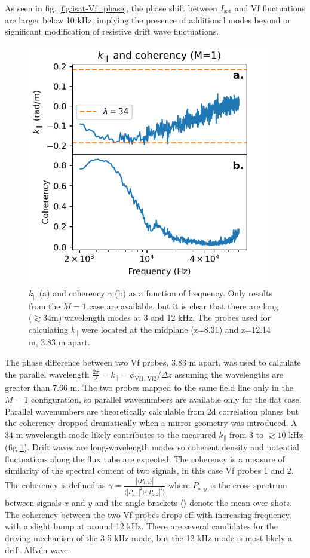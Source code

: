 As seen in fig. \ref{fig:isat-Vf_phase}, the phase shift between $I_\text{sat}$ and Vf fluctuations are larger below 10 kHz, implying the presence of additional modes beyond or significant modification of resistive drift wave fluctuations.
\begin{figure}
    \centering
    \includegraphics[width=300pt]{figures/fig11.pdf}
    \caption[$k_\parallel$ and coherency $\gamma$]{$k_\parallel$ (a) and coherency $\gamma$ (b) as a function of frequency. Only results from the $M=1$ case are available, but it is clear that there are long ($\gtrsim 34$m) wavelength modes at 3 and 12 kHz. The probes used for calculating $k_\parallel$ were located at the midplane (z=8.31) and z=12.14 m, 3.83 m apart.}
    \label{fig:kparallel-coherency}
\end{figure}
The phase difference between two Vf probes, $3.83$ m apart, was used to calculate the parallel wavelength $\frac{2 \pi}{\lambda} = k_\parallel = \phi_{\text{Vf1, Vf2}} / \Delta z$ assuming the wavelengths are greater than $7.66$ m. The two probes mapped to the same field line only in the $M=1$ configuration, so parallel wavenumbers are available only for the flat case. Parallel wavenumbers are theoretically calculable from 2d correlation planes but the coherency dropped dramatically when a mirror geometry was introduced.
A $34$ m wavelength mode likely contributes to the measured $k_\parallel$ from $3$ to  $\gtrsim 10$ kHz (fig \ref{fig:kparallel-coherency}). Drift waves are long-wavelength modes so coherent density and potential fluctuations along the flux tube are expected. The coherency is a measure of similarity of the spectral content of two signals, in this case Vf probes 1 and 2. The coherency is defined as $\gamma = \frac{|\langle P_{1,2} \rangle|}{\langle |P_{1,1}|^2 \rangle \langle |P_{2,2}|^2 \rangle}$ where $P_{x,y}$ is the cross-spectrum between signals $x$ and $y$ and the angle brackets $\langle \rangle$ denote the mean over shots. The coherency between the two Vf probes drops off with increasing frequency, with a slight bump at around 12 kHz. There are several candidates for the driving mechanism of the 3-5 kHz mode, but the 12 kHz mode is most likely a drift-Alfvén wave.

